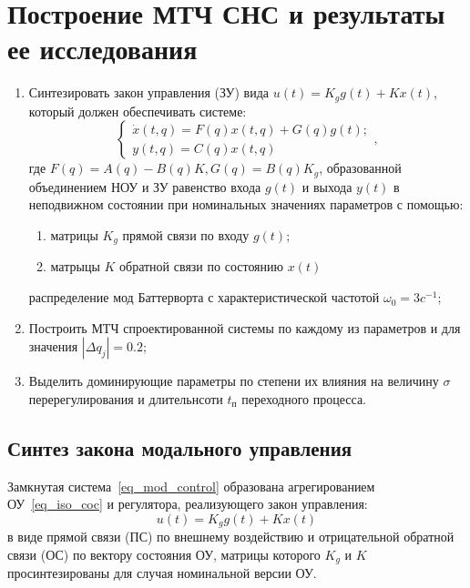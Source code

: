 \section{Построение МТЧ СНС и результаты ее исследования}

\begin{enumerate}
	\item Синтезировать закон управления (ЗУ) вида $u(t) = K_g g(t) + K x(t)$, который должен обеспечивать системе:
	\begin{equation}\label{eq_mod_control}
		\begin{cases}
			\dot x(t, q) = F(q) x(t,q) + G(q) g(t);\\
			y(t, q) = C(q) x(t,q)
		\end{cases},
	\end{equation} 
	где $F(q) = A(q) - B(q) K, G(q) = B(q) K_g$,
	образованной объединением НОУ и ЗУ равенство входа $g(t)$ и выхода $y(t)$ в неподвижном состоянии при номинальных значениях параметров с помощью:
	\begin{enumerate}
		\item матрицы $K_g$ прямой связи по входу $g(t)$;
		\item матрыцы $K$ обратной связи по состоянию $x(t)$
	\end{enumerate}
	распределение мод Баттерворта с характеристической частотой $\omega_0 = 3 c^{-1}$;
	\item Построить МТЧ спроектированной системы по каждому из параметров и для значения $|\Delta q_j| = 0.2$;
	\item Выделить доминирующие параметры по степени их влияния на величину $\sigma$ перерегулирования и длительнсоти $t_\text{п}$ переходного процесса.
\end{enumerate}

\subsection{Синтез закона модального управления}


Замкнутая система~\ref{eq_mod_control} образована агрегированием ОУ~\ref{eq_iso_coc} и регулятора, реализующего закон управления:
\begin{equation}\label{reg}
	u(t) = K_g g(t) + K x(t)
\end{equation}
в виде прямой связи (ПС) по внешнему воздействию и отрицательной обратной связи (ОС) по вектору состояния ОУ, матрицы которого $K_g$ и $K$ просинтезированы для случая номинальной версии ОУ.


